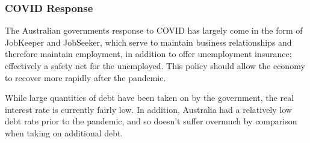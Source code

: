 \documentclass[12pt]{report}
\begin{document}
\begin{flushleft}
\subsubsection*{COVID Response}

The Australian governments response to COVID has largely come in the form of
JobKeeper and JobSeeker, which serve to maintain business relationships and
therefore maintain employment, in addition to offer unemployment insurance;
effectively a safety net for the unemployed. This policy should allow the 
economy to recover more rapidly after the pandemic. \par
While large quantities of debt have been taken on by the government, the 
real interest rate is currently fairly low. In addition, Australia had a
relatively low debt rate prior to the pandemic, and so doesn't suffer overmuch
by comparison when taking on additional debt.

\end{flushleft}
\end{document}
